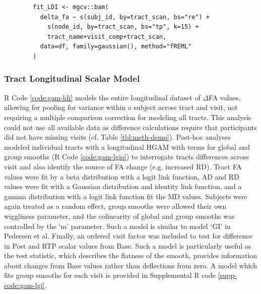 \documentclass[12pt]{article}
\begin{document}
\begin{equ}[H]
	\begin{lstlisting}
		fit_LDI <- mgcv::bam(
		  delta_fa ~ s(subj_id, by=tract_scan, bs="re") +
		    s(node_id, by=tract_scan, bs="tp", k=15) +
		    tract_name+visit_comp+tract_scan,
		  data=df, family=gaussian(), method="fREML"
		)
	\end{lstlisting}
	\caption{$\Delta$FA values are modeled as a function of tract node for each tract, accounting for the within-subject factors of tract and visit and using separate wiggliness terms. \lstinline{delta_fa} = RTP-Base and Post-Base FA differences, \lstinline{subj_id} = subject identifier factor, \lstinline{node_id} = node identifier integer, \lstinline{tract_name} = tract identifier factor, \lstinline{visit_comp} = visit comparison factor (RTP-Base, Post-Base), and \lstinline{tract_scan} = interaction of \lstinline{tract_name} and \lstinline{visit_comp}.}
	\label{code:gam-ldi}
\end{equ}


\subsubsection{Tract Longitudinal Scalar Model}
\label{sssec:meth-gam-lgio}
R Code \ref{code:gam-ldi} models the entire longitudinal dataset of $\Delta$FA values, allowing for pooling for variance within a subject across tract and visit, not requiring a multiple comparison correction for modeling all tracts. This analysis could not use all available data as difference calculations require that participants did not have missing visits (cf. Table \ref{tbl:meth-demo}). Post-hoc analyses modeled individual tracts with a longitudinal HGAM with terms for global and group smooths (R Code \ref{code:gam-lgio}) to interrogate tracts differences across visit and also identify the source of FA change (e.g. increased RD). Tract FA values were fit by a beta distribution with a logit link function, AD and RD values were fit with a Gaussian distribution and identity link function, and a gamma distribution with a logit link function fit the MD values. Subjects were again treated as a random effect, group smooths were allowed their own wiggliness parameter, and the colinearity of global and group smooths was controlled by the `m' parameter. Such a model is similar to model `GI' in Pedersen et al. \autocite{pedersen2019HierarchicalGeneralizedAdditive} Finally, an ordered visit factor was included to test for difference in Post and RTP scalar values from Base. Such a model is particularly useful as the test statistic, which describes the flatness of the smooth, provides information about changes from Base values rather than deflections from zero. A model which fits group smooths for each visit is provided in Supplemental R code \ref{supp-code:gam-lgi}.
\end{document}
